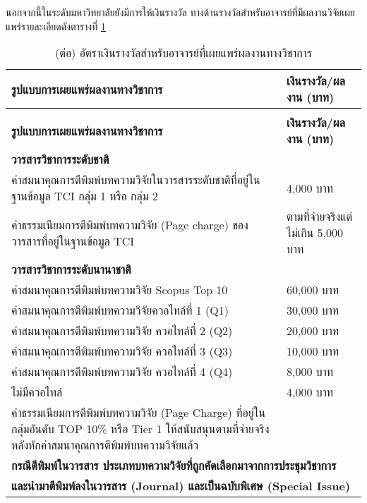 นอกจากนี้ในระดับมหาวิทยาลัยยังมีการให้เงินรางวัล ทางด้านรางวัลสำหรับอาจารย์ที่มีผลงานวิจัยเผยแพร่รายละเอียดดังตารางที่ \ref{Table:award}
\begin{center}
		\begin{longtable}{|p{}|p{}|}
			 \caption{อัตราเงินรางวัลสำหรับอาจารย์ที่เผยแพร่ผลงานทางวิชาการ}
			\label{Table:award}\\
			\hline
		   \textbf{รูปแบบการเผยแพร่ผลงานทางวิชาการ}	&\textbf{เงินรางวัล/ผลงาน (บาท)}\\
		  	 \hline
			\endfirsthead
			 \caption{(ต่อ) อัตราเงินรางวัลสำหรับอาจารย์ที่เผยแพร่ผลงานทางวิชาการ}
		\\
		\hline
		\textbf{รูปแบบการเผยแพร่ผลงานทางวิชาการ}	&\textbf{เงินรางวัล/ผลงาน (บาท)}\\
		\hline
		\endhead	
			\multicolumn{2}{|l|}{\textbf{วารสารวิชาการระดับชาติ}	
		}\\
			\hline
			ค่าสมนาคุณการตีพิมพ์บทความวิจัยในวารสารระดับชาติที่อยู่ในฐานข้อมูล TCI กลุ่ม 1 หรือ กลุ่ม 2	&4,000 บาท\\
			\hline
			ค่าธรรมเนียมการตีพิมพ์บทความวิจัย (Page   charge) ของวารสารที่อยู่ในฐานข้อมูล TCI      	&ตามที่จ่ายจริงแต่ไม่เกิน  5,000 บาท\\
			\hline
			\multicolumn{2}{|l|}{\textbf{วารสารวิชาการระดับนานาชาติ}}\\
			\hline
			ค่าสมนาคุณการตีพิมพ์บทความวิจัย Scopus Top 10%
			&60,000 บาท\\
			\hline
			ค่าสมนาคุณการตีพิมพ์บทความวิจัยควอไทล์ที่ 1 (Q1)         	&30,000 บาท	\\
			\hline
			ค่าสมนาคุณการตีพิมพ์บทความวิจัย ควอไทล์ที่ 2 (Q2)         	&20,000 บาท	\\
			\hline
			ค่าสมนาคุณการตีพิมพ์บทความวิจัย ควอไทล์ที่ 3 (Q3)         	&10,000 บาท\\
			\hline
			ค่าสมนาคุณการตีพิมพ์บทความวิจัย ควอไทล์ที่ 4 (Q4)         	&8,000 บาท	\\
			\hline
			ไม่มีควอไทล์ 	&4,000 บาท	\\
			\hline
			ค่าธรรมเนียมการตีพิมพ์บทความวิจัย (Page Charge) ที่อยู่ในกลุ่มอันดับ TOP 10\% หรือ Tier 1 ให้สนับสนุนตามที่จ่ายจริงหลังหักค่าสมนาคุณการตีพิมพ์บทความวิจัยแล้ว  &\\
			\hline
			\multicolumn{2}{|l|}{\textbf{กรณีตีพิมพ์ในวารสาร ประเภทบทความวิจัยที่ถูกคัดเลือกมาจากการประชุมวิชาการ}}\\[-0.15cm]
				\multicolumn{2}{|l|}{\textbf{และนำมาตีพิมพ์ลงในวารสาร (Journal) และเป็นฉบับพิเศษ (Special Issue)}}\\

\end{longtable}
\end{center}
